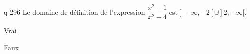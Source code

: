 \begin{truefalse}{q-296}
Le domaine de définition de l'expression $\dfrac{x^2-1}{x^2-4}$ est $]-\infty,-2[\cup]2,+\infty[$.
\item Vrai
\item* Faux
\end{truefalse}

